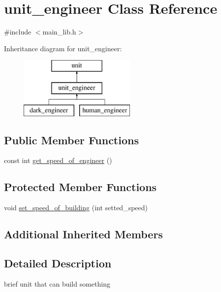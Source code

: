 \hypertarget{classunit__engineer}{}\section{unit\+\_\+engineer Class Reference}
\label{classunit__engineer}


{\ttfamily \#include $<$main\+\_\+lib.\+h$>$}

Inheritance diagram for unit\+\_\+engineer\+:\begin{figure}[H]
\begin{center}
\leavevmode
\includegraphics[height=3.000000cm]{classunit__engineer}
\end{center}
\end{figure}
\subsection*{Public Member Functions}
\begin{DoxyCompactItemize}
\item 
const int \mbox{\hyperlink{classunit__engineer_a9f3149789f1883a468132a20a96bc7b7}{get\+\_\+speed\+\_\+of\+\_\+engineer}} ()
\end{DoxyCompactItemize}
\subsection*{Protected Member Functions}
\begin{DoxyCompactItemize}
\item 
void \mbox{\hyperlink{classunit__engineer_a76ac2640e3e83af2d07c99d124331c12}{set\+\_\+speed\+\_\+of\+\_\+building}} (int setted\+\_\+speed)
\end{DoxyCompactItemize}
\subsection*{Additional Inherited Members}


\subsection{Detailed Description}
brief unit that can build something 

